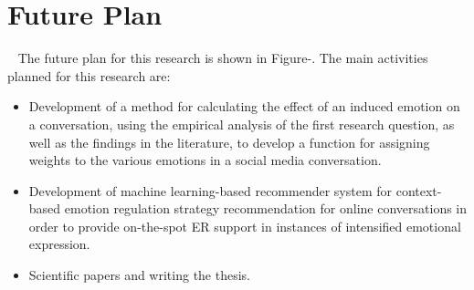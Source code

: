 \section{Future Plan}~\label{sec:discussion}
The future plan for this research is shown in Figure-. The main activities planned for this research are:
\begin{itemize}
    \item Development of a method for calculating the effect of an induced emotion on a conversation, using the empirical analysis of the first research question, as well as the findings in the literature, to develop a function for assigning weights to the various emotions in a social media conversation.
    \item Development of machine learning-based recommender system for context-based emotion regulation strategy recommendation for online conversations in order to provide on-the-spot ER support in instances of intensified emotional expression.
    \item Scientific papers and writing the thesis.
\end{itemize}
